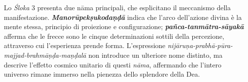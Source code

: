 Lo \textit{Śloka} 3 presenta due nāma principali, che esplicitano il meccanismo della manifestazione. \textbf{\textit{Manorūpekṣukodaṇḍā}} indica che l’arco dell’azione divina è la mente stessa, principio di proiezione e configurazione; \textbf{\textit{pañca-tanmātra-sāyakā}} afferma che le frecce sono le cinque determinazioni sottili della percezione, attraverso cui l’esperienza prende forma. L’espressione \textit{nijāruṇa-prabhā-pūra-majjad-brahmāṇḍa-maṇḍalā }non introduce un ulteriore nome distinto, ma descrive l’effetto cosmico unitario di questi \textit{nāma}, affermando che l’intero universo rimane immerso nella pienezza dello splendore della Dea.
